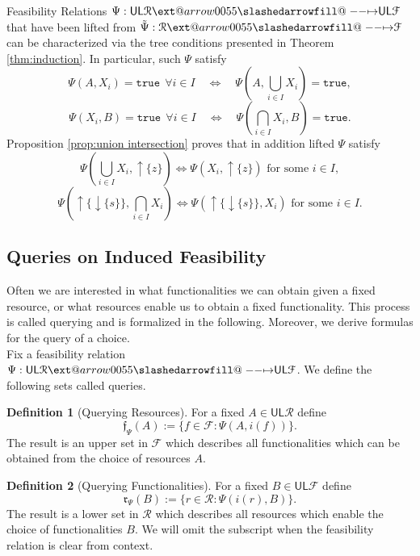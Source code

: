 \documentclass[12pt]{article}
\makeatletter
\theoremstyle{definition}
\newtheorem{definition}{Definition}[section]
\theoremstyle{plain}
\theoremstyle{plain}
\theoremstyle{plain}
\theoremstyle{plain}
\theoremstyle{remark}
\theoremstyle{remark}
\newcommand{\mc}[1]{\mathcal{#1}}
\newcommand{\low}{\mathsf{L}}
\newcommand{\upper}{\mathsf{U}}
\newcommand{\true}{\mathtt{true}}
\newcommand{\upc}[1]{{\uparrow #1}}
\newcommand{\lwc}[1]{{\downarrow #1}}
\def\slashedarrowfill@#1#2#3#4#5{%
	$\m@th\thickmuskip0mu\medmuskip\thickmuskip\thinmuskip\thickmuskip
	\relax#5#1\mkern-7mu%
	\cleaders\hbox{$#5\mkern-2mu#2\mkern-2mu$}\hfill
	\mathclap{#3}\mathclap{#2}%
	\cleaders\hbox{$#5\mkern-2mu#2\mkern-2mu$}\hfill
	\mkern-7mu#4$%
}
\def\rightslashedarrowfill@{%
	\slashedarrowfill@\relbar\relbar\mapstochar\rightarrow}
\newcommand\xslashedrightarrow[2][]{%
	\ext@arrow 0055{\rightslashedarrowfill@}{#1}{#2}}
\makeatother
\begin{document}
\begin{tcolorbox}[title=Characterizing Lifted Feasibility Relations, colframe=Apricot, colback = paleorange, coltitle = Sepia]
	Feasibility Relations $\Psi: \upper\low\mc{R} \xslashedrightarrow{} \upper\low\mc{F}$ that have been lifted from $\tilde\Psi: \mc{R} \xslashedrightarrow{} \mc{F}$ can be characterized via the tree conditions presented in Theorem \ref{thm:induction}. In particular,
	such $\Psi$ satisfy
	$$\Psi(A,X_i) = \true \:\: \forall i \in I \quad \Leftrightarrow \quad \Psi(A,\bigcup_{i \in I} X_i) = \true,$$
	$$\Psi(X_i,B) = \true \:\: \forall i \in I \quad \Leftrightarrow \quad \Psi(\bigcap_{i \in I}X_i,B) = \true.$$
	Proposition \ref{prop:union intersection} proves that in addition lifted $\Psi$ satisfy
	$$\Psi(\bigcup_{i \in I} X_i, \upc{\{z\}}) \Leftrightarrow \Psi(X_i,\upc{\{z\}}) \text{ for some } i \in I,$$
	$$\Psi(\upc{\{\lwc{\{s\}}\}}, \bigcap_{i \in I}X_i) \Leftrightarrow \Psi(\upc{\{\lwc{\{s\}}\}},X_i) \text{ for some } i \in I.$$
\end{tcolorbox}

\subsection{Queries on Induced Feasibility}
Often we are interested in what functionalities we can obtain given a fixed resource, or what resources enable us to obtain a fixed functionality. This process is called querying and is formalized in the following. Moreover, we derive formulas for the query of a choice.\\

Fix a feasibility relation $\Psi: \upper\low\mc{R} \xslashedrightarrow{} \upper\low\mc{F}$. We define the following sets called queries. 

\begin{definition}[Querying Resources]
	For a fixed $A \in \upper\low\mc{R}$ define 
	$$\mathfrak{f}_\Psi(A) := \{f \in \mc{F} : \Psi(A,i(f)) \}.$$
	The result is an upper set in $\mc{F}$ which describes all functionalities which can be obtained from the choice of resources $A$.
\end{definition}

\begin{definition}[Querying Functionalities]
	For a fixed $B \in \upper\low\mc{F}$ define 
	$$\mathfrak{r}_\Psi(B) := \{r \in \mc{R} : \Psi(i(r),B) \}.$$
	The result is a lower set in $\mc{R}$ which describes all resources which enable the choice of functionalities $B$. We will omit the subscript when the feasibility relation is clear from context.
\end{definition}
\end{document}
